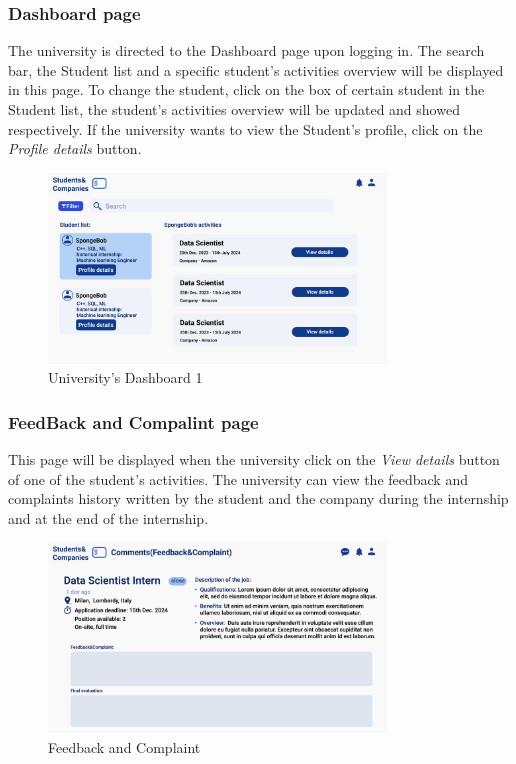 \subsubsection{Dashboard page}
The university is directed to the Dashboard page upon logging in. The search bar, the Student list and a 
specific student's activities overview will be displayed in this page. To change the student, click on 
the box of certain student in the Student list, the student's activities overview will be updated and showed
respectively. If the university wants to view the Student's profile, click on the \textit{Profile details} button.
\begin{figure}[H]
    \centering
    \includegraphics[width=0.8\textwidth]{Images/UI/Dashboard 1-university.png}
    \caption{University's Dashboard 1}\label{fig:DashboardUniversity1}
\end{figure}

\subsubsection{FeedBack and Compalint page}
This page will be displayed when the university click on the \textit{View details} button of one of the student's activities.
The university can view the feedback and complaints history written by the student and the company during the internship and 
at the end of the internship.

\begin{figure}[H]
    \centering
    \includegraphics[width=0.8\textwidth]{Images/UI/FeedBack&Complaint- University view.png}
    \caption{Feedback and Complaint}\label{fig:Feedback and Complaint University}
\end{figure}